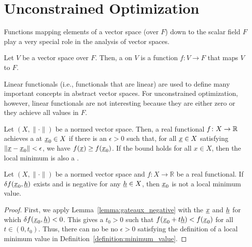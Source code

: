 \section{Unconstrained Optimization}

Functions mapping elements of a vector space (over $F$) down to the scalar field $F$ play a very special role in the analysis of vector spaces.

\begin{definition}
Let $V$ be a vector space over $F$.
Then, a  on $V$ is a function $f \colon V \rightarrow F$ that maps $V$ to $F$.
\end{definition}

Linear functionals (i.e., functionals that are linear) are used to define many important concepts in abstract vector spaces.
For unconstrained optimization, however, linear functionals are not interesting because they are either zero or they achieve all values in $F$.

\begin{definition}
\label{definition:minimum_value}
Let $(X,\|\cdot\|)$ be a normed vector space.
Then, a real functional $f \colon X \rightarrow \mathbb{R}$ achieves a  at $\underline{x}_0 \in X$ if there is an $\epsilon > 0$ such that, for all $\underline{x}\in X$ satisfying $\| \underline{x} - \underline{x}_0 \| < \epsilon$, we have  $f(\underline{x}) \geq f(\underline{x}_0)$.
If the bound holds for all $x\in X$, then the local minimum is also a .
\end{definition}

\begin{theorem}
Let $(X,\|\cdot\|)$ be a normed vector space and $f\colon X \to \mathbb{R}$ be a real functional.
If $\delta f (\underline{x}_0,\underline{h})$ exists and is negative for any $\underline{h} \in X$, then $\underline{x}_0$ is not a local minimum value.
\end{theorem}
\begin{proof}
First, we apply Lemma~\ref{lemma:gateaux_negative} with the $\underline{x}$ and $\underline{h}$ for which $\delta f (\underline{x}_0,\underline{h})<0$.
This gives a $t_0 >0$ such that $f(\underline{x}_0+t \underline{h})<f(\underline{x}_0)$ for all $t\in (0,t_0)$.
Thus, there can no be no $\epsilon>0$ satisfying the definition of a local minimum value in  Definition~\ref{definition:minimum_value}.
\end{proof}

